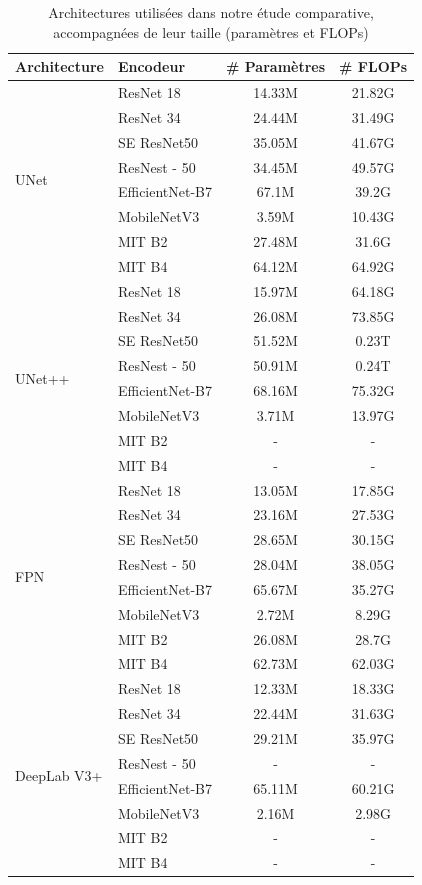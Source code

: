 \begin{table}
	\centering
	\caption{Architectures utilisées dans notre étude comparative, accompagnées de leur taille (paramètres et FLOPs)}
	\label{tab:segmentationNetworks}
	\begin{tabularx}{\textwidth}{Xlcc}
		\toprule
		Architecture & Encodeur & \# Paramètres & \# FLOPs \\
		\midrule
		\multirow{8}{3em}{UNet} & ResNet 18  & 14.33M & 21.82G \\ 
		& ResNet 34  & 24.44M & 31.49G \\ 
		& SE ResNet50  & 35.05M & 41.67G \\ 
		& ResNest - 50  & 34.45M & 49.57G \\ 
		& EfficientNet-B7  & 67.1M & 39.2G \\ 
		& MobileNetV3  & 3.59M & 10.43G \\ 
		& MIT B2  & 27.48M & 31.6G \\ 
		& MIT B4  & 64.12M & 64.92G \\ 
		\midrule
		\multirow{8}{3em}{UNet++} & ResNet 18  & 15.97M & 64.18G \\ 
		& ResNet 34  & 26.08M & 73.85G \\ 
		& SE ResNet50  & 51.52M & 0.23T \\ 
		& ResNest - 50  & 50.91M & 0.24T \\ 
		& EfficientNet-B7  & 68.16M & 75.32G \\ 
		& MobileNetV3  & 3.71M & 13.97G \\ 
		& MIT B2  & \multicolumn{1}{c}{-} & \multicolumn{1}{c}{-} \\ 
		& MIT B4  & \multicolumn{1}{c}{-} & \multicolumn{1}{c}{-} \\ 
		\midrule
		\multirow{8}{3em}{FPN} & ResNet 18  & 13.05M & 17.85G \\ 
		& ResNet 34  & 23.16M & 27.53G \\ 
		& SE ResNet50  & 28.65M & 30.15G \\ 
		& ResNest - 50  & 28.04M & 38.05G \\ 
		& EfficientNet-B7  & 65.67M & 35.27G \\ 
		& MobileNetV3  & 2.72M & 8.29G \\ 
		& MIT B2  & 26.08M & 28.7G \\ 
		& MIT B4  & 62.73M & 62.03G \\ 
		\midrule
		\multirow{8}{3em}{DeepLab V3+} & ResNet 18  & 12.33M & 18.33G \\ 
		& ResNet 34  & 22.44M & 31.63G \\ 
		& SE ResNet50  & 29.21M & 35.97G \\ 
		& ResNest - 50  & \multicolumn{1}{c}{-} & \multicolumn{1}{c}{-} \\ 
		& EfficientNet-B7  & 65.11M & 60.21G \\ 
		& MobileNetV3  & 2.16M & 2.98G \\ 
		& MIT B2  & \multicolumn{1}{c}{-} & \multicolumn{1}{c}{-} \\ 
		& MIT B4  & \multicolumn{1}{c}{-} & \multicolumn{1}{c}{-} \\ 
		\bottomrule
	\end{tabularx}
\end{table}



